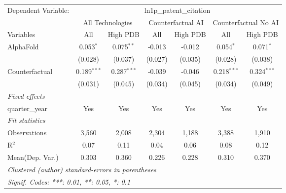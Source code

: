 \begingroup
\centering
\begin{tabular}{lcccccc}
   \tabularnewline \midrule \midrule
   Dependent Variable: & \multicolumn{6}{c}{ln1p\_patent\_citation}\\
 & \multicolumn{2}{c}{All Technologies} & \multicolumn{2}{c}{Counterfactual AI} & \multicolumn{2}{c}{Counterfactual No AI} \\
\cmidrule(lr){1-1}\cmidrule(lr){2-3} \cmidrule(lr){4-5} \cmidrule(lr){6-7}
Variables & \multicolumn{1}{c}{All} & \multicolumn{1}{c}{High PDB} & \multicolumn{1}{c}{All} & \multicolumn{1}{c}{High PDB} & \multicolumn{1}{c}{All} & \multicolumn{1}{c}{High PDB} \\
\cmidrule(lr){1-1}\cmidrule(lr){2-2} \cmidrule(lr){3-3} \cmidrule(lr){4-4} \cmidrule(lr){5-5} \cmidrule(lr){6-6} \cmidrule(lr){7-7}
   AlphaFold      & 0.053$^{*}$   & 0.075$^{**}$  & -0.013  & -0.012  & 0.054$^{*}$   & 0.071$^{*}$\\   
                  & (0.028)       & (0.037)       & (0.027) & (0.035) & (0.028)       & (0.038)\\   
   Counterfactual & 0.189$^{***}$ & 0.287$^{***}$ & -0.039  & -0.046  & 0.218$^{***}$ & 0.324$^{***}$\\   
                  & (0.031)       & (0.045)       & (0.034) & (0.045) & (0.034)       & (0.049)\\   
   \midrule
   \emph{Fixed-effects}\\
   quarter\_year  & Yes           & Yes           & Yes     & Yes     & Yes           & Yes\\  
   \midrule
   \emph{Fit statistics}\\
   Observations   & 3,560         & 2,008         & 2,304   & 1,188   & 3,388         & 1,910\\  
   R$^2$          & 0.07          & 0.11          & 0.04    & 0.06    & 0.08          & 0.12\\  
Mean(Dep. Var.) & 0.303 & 0.360 & 0.226 & 0.228 & 0.310 & 0.370 \\
   \midrule \midrule
   \multicolumn{7}{l}{\emph{Clustered (author) standard-errors in parentheses}}\\
   \multicolumn{7}{l}{\emph{Signif. Codes: ***: 0.01, **: 0.05, *: 0.1}}\\
\end{tabular}
\par\endgroup
